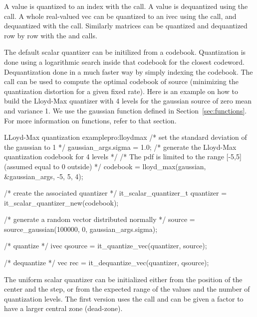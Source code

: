       A value is quantized to an index with the
       call. A value is dequantized using the
       call. A whole
      real-valued vec can be quantized to an ivec using the
       call, and
      dequantized with the 
      call. Similarly matrices can be quantized and dequantized row by
      row with the 
       and
       calls.

      The default scalar quantizer can be initilized from a
      codebook. Quantization is done using a logarithmic search inside
      that codebook for the closest codeword. Dequantization done in a
      much faster way by simply indexing the codebook. The 
       call can be used to
      compute the optimal codebook of source (minimizing the
      quantization distortion for a given fixed rate). Here is an
      example on how to build the Lloyd-Max quantizer with 4 levels
      for the gaussian source of zero mean and variance 1. We use the
      gaussian function defined in Section~\ref{sec:functions}. For
      more information on functions, refer to that section.

  \begin{program}{LLoyd-Max quantization example}{pro:lloydmax}
  /* set the standard deviation of the gaussian to 1 */
  gaussian_args.sigma = 1.0; 
  /* generate the Lloyd-Max quantization codebook for 4 levels */
  /* The pdf is limited to the range [-5,5] (assumed equal to 0 outside) */
  codebook = lloyd_max(gaussian, &gaussian_args, -5, 5, 4);

  /* create the associated quantizer */
  it_scalar_quantizer_t quantizer = it_scalar_quantizer_new(codebook);

  /* generate a random vector distributed normally */
  source = source_gaussian(100000, 0, gaussian_args.sigma);

  /* quantize */
  ivec qsource = it_quantize_vec(quantizer, source);

  /* dequantize */
  vec rec = it_dequantize_vec(quantizer, qsource);
\end{program}

      The uniform scalar quantizer can be initialized either from the
      position of the center and the step, or from the expected range
      of the values and the number of quantization levels. The first
      version uses the 
      call and can be given a factor to have a larger central zone
      (dead-zone). 

